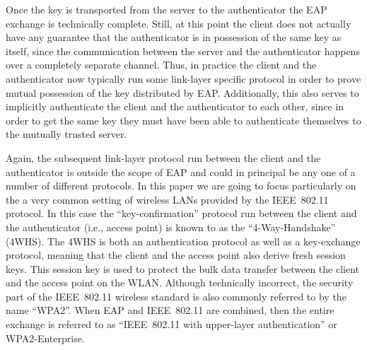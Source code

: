Once the key is transported from the server to the authenticator the EAP exchange is technically complete.   
Still,
at this point the client does not actually have any guarantee that the authenticator is in possession of the same key as itself,
since the communication between the server and the authenticator happens over a completely separate channel.
Thus,
in practice the client and the authenticator now typically run some link-layer specific protocol in order to prove mutual possession of the key distributed by EAP. 
Additionally,
this also serves to implicitly authenticate the client and the authenticator to each other,
since in order to get the same key they must have been able to authenticate themselves to the mutually trusted server.

Again,
the subsequent link-layer protocol run between the client and the authenticator is outside the scope of EAP
and could in principal be any one of a number of different protocols.
In this paper we are going to focus particularly on the a very common setting of wireless LANs provided by the IEEE~802.11 protocol\cite{IEEE:2012:802.11}.
In this case the ``key-confirmation'' protocol run between the client and the authenticator (i.e., access point) 
is known to as the ``4-Way-Handshake'' (4WHS).
The 4WHS is both an authentication protocol as well as a key-exchange protocol,
meaning that the client and the access point also derive fresh session keys.
This session key is used to protect the bulk data transfer between the client and the access point on the WLAN.
Although technically incorrect,
the security part of the IEEE~802.11 wireless standard is also commonly referred to by the name ``WPA2''.
When EAP and IEEE~802.11 are combined,
then the entire exchange is referred to as ``IEEE~802.11 with upper-layer authentication'' or WPA2-Enterprise.







